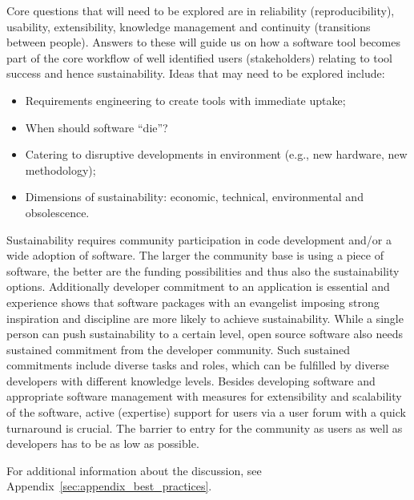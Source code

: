 Core questions that will need to be explored are in reliability
(reproducibility), usability, extensibility, knowledge management and continuity
(transitions between people). Answers to these will guide us on how a software
tool becomes part of the core workflow of well identified users (stakeholders)
relating to tool success and hence sustainability.
Ideas  that may need to be explored include:
\begin{itemize}
\item Requirements engineering to create tools with immediate uptake;
\item When should software ``die''?
\item Catering to disruptive developments in environment (e.g., new hardware,
new methodology);
\item Dimensions of sustainability: economic, technical, environmental and
obsolescence. 
\end{itemize}

Sustainability requires community participation in code development and/or a
wide adoption of software. The larger the community base is using a piece of
software, the better are the funding possibilities and thus also the
sustainability options. Additionally developer commitment to an application is
essential and experience shows that software packages with an evangelist
imposing strong inspiration and discipline are more likely to achieve
sustainability. While a single person can push sustainability to a certain
level, open source software also needs sustained commitment from the developer
community. Such sustained commitments include diverse tasks and roles, which can
be fulfilled by diverse developers with different knowledge levels. Besides
developing software and appropriate software management with measures for
extensibility and scalability of the software, active (expertise) support for
users via a user forum with a quick turnaround is crucial. The barrier to entry
for the community as users as well as developers has to be as low as possible.

For additional information about the discussion, see
Appendix~\ref{sec:appendix_best_practices}.


